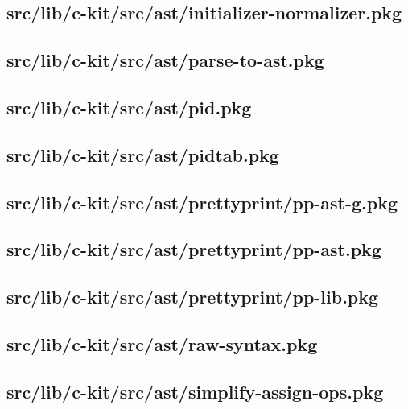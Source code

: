 \subsection{src/lib/c-kit/src/ast/initializer-normalizer.pkg}


\subsection{src/lib/c-kit/src/ast/parse-to-ast.pkg}


\subsection{src/lib/c-kit/src/ast/pid.pkg}


\subsection{src/lib/c-kit/src/ast/pidtab.pkg}


\subsection{src/lib/c-kit/src/ast/prettyprint/pp-ast-g.pkg}


\subsection{src/lib/c-kit/src/ast/prettyprint/pp-ast.pkg}


\subsection{src/lib/c-kit/src/ast/prettyprint/pp-lib.pkg}


\subsection{src/lib/c-kit/src/ast/raw-syntax.pkg}


\subsection{src/lib/c-kit/src/ast/simplify-assign-ops.pkg}


